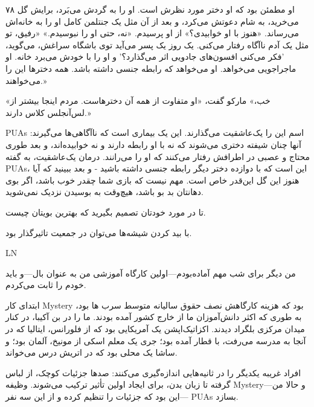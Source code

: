 ۷۸
او مطمئن بود که او دختر مورد نظرش است. او را به گردش می‌بَرد، برایش گل می‌خرید، به شام دعوتش می‌کرد، و بعد از آن مثل یک جنتلمن کامل او را به خانه‌اش می‌رساند.
«هنوز با او خوابیدی؟» از او پرسیدم.
«نه، حتی او را نبوسیدم.»
«رفیق، تو مثل یک آدم ناآگاه رفتار می‌کنی. یک روز یک پسر می‌آید توی باشگاه سراغش، می‌گوید، 'فکر می‌کنی افسون‌های جادویی اثر می‌گذارد؟' و او را با خودش می‌برد خانه. او ماجراجویی می‌خواهد. او می‌خواهد که رابطه جنسی داشته باشد. همه دخترها این را می‌خواهند.»

«خب،» مارکو گفت، «او متفاوت از همه آن دخترهاست. مردم اینجا بیشتر از لس‌آنجلس کلاس دارند.»

PUAs اسم این را یک‌عاشقیت می‌گذارند. این یک بیماری است که ناآگاهی‌ها می‌گیرند: آنها چنان شیفته دختری می‌شوند که نه با او رابطه دارند و نه خوابیده‌اند، و بعد طوری محتاج و عصبی در اطرافش رفتار می‌کنند که او را می‌رانند. درمان یک‌عاشقیت، به گفته PUAs، این است که با دوازده دختر دیگر رابطه جنسی داشته باشید - و بعد ببینید که آیا هنوز این گل این‌قدر خاص است. مهم نیست که بازی شما چقدر خوب باشد، اگر بوی دهانتان بد بو باشد، هیچ‌وقت به بوسیدن نزدیک نمی‌شوید.

تا در مورد خودتان تصمیم بگیرید که بهترین بویتان چیست.

با بید کردن شیشه‌ها می‌توان در جمعیت تاثیرگذار بود.

LN

من دیگر برای شب مهم آماده‌بودم—اولین کارگاه آموزشی من به عنوان بال—و باید خودم را ثابت می‌کردم.

ابتدای کار Mystery بود که هزینه کارگاهش نصف حقوق سالیانه متوسط سرب ها بود، به طوری که اکثر دانش‌آموزان ما از خارج کشور آمده بودند. ما را در بن آکیبا، در کنار میدان مرکزی بلگراد دیدند. اکزاتیک‌اپشن یک آمریکایی بود که از فلورانس، ایتالیا که در آنجا به مدرسه می‌رفت، با قطار آمده بود؛ جری یک معلم اسکی از مونیخ، آلمان بود؛ و ساشا یک محلی بود که در اتریش درس می‌خواند.

افراد غریبه یکدیگر را در ثانیه‌هایی اندازه‌گیری می‌کنند: صدها جزئیات کوچک، از لباس گرفته تا زبان بدن، برای ایجاد اولین تأثیر ترکیب می‌شوند. وظیفه Mystery—و حالا من—این بود که جزئیات را تنظیم کرده و از این سه نفر PUAs بسازد.